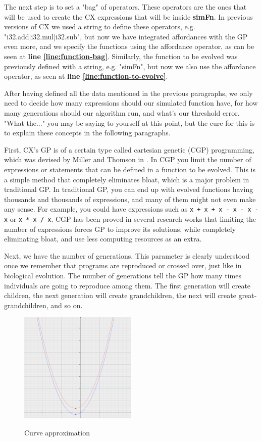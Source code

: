 \documentclass[11pt,fleqn,openany]{book} %
\begin{document}
The next step is to set a "bag" of operators. These operators are the ones that will be used to create the CX expressions that will be inside \textbf{simFn}. In previous versions of CX we used a string to define these operators, e.g. "i32.add|i32.mul|i32.sub", but now we have integrated affordances with the GP even more, and we specify the functions using the affordance operator, as can be seen at \textbf{line \ref{line:function-bag}}. Similarly, the function to be evolved was previously defined with a string, e.g. "simFn", but now we also use the affordance operator, as seen at \textbf{line \ref{line:function-to-evolve}}.

After having defined all the data mentioned in the previous paragraphs, we only need to decide how many expressions should our simulated function have, for how many generations should our algorithm run, and what's our threshold error. "What the..." you may be saying to yourself at this point, but the cure for this is to explain these concepts in the following paragraphs.

First, CX's GP is of a certain type called cartesian genetic (CGP) programming, which was devised by Miller and Thomson in \cite{miller2000cartesian}. In CGP you limit the number of expressions or statements that can be defined in a function to be evolved. This is a simple method that completely eliminates bloat, which is a major problem in traditional GP. In traditional GP, you can end up with evolved functions having thousands and thousands of expressions, and many of them might not even make any sense. For example, you could have expressions such as \lstinline{x + x + x - x - x - x} or \lstinline{x * x / x}. CGP has been proved in several research works that limiting the number of expressions forces GP to improve its solutions, while completely eliminating bloat, and use less computing resources as an extra.

Next, we have the number of generations. This parameter is clearly understood once we remember that programs are reproduced or crossed over, just like in biological evolution. The number of generations tell the GP how many times individuals are going to reproduce among them. The first generation will create children, the next generation will create grandchildren, the next will create great-grandchildren, and so on.

\begin{figure}
\caption{Curve approximation}
\centering
\includegraphics[width=0.5\textwidth]{img/curve-approximation.png}
\label{figure:curve-approximation}
\end{figure}
\end{document}
